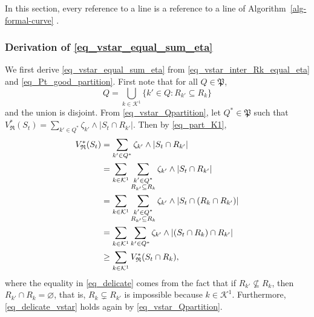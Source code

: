 \documentclass[
  11pt,
  a4paper,
]{article}
\theoremstyle{plain}
\theoremstyle{definition}
\theoremstyle{plain}
\theoremstyle{definition}
\theoremstyle{plain}
\theoremstyle{remark}
\begin{document}
In this section, every reference to a line is a reference to a line of
 Algorithm~\ref{alg-formal-curve} .

\subsubsection{\texorpdfstring{Derivation of
\eqref{eq_vstar_equal_sum_eta}}{Derivation of }}\label{derivation-of}

We first derive \eqref{eq_vstar_equal_sum_eta} from
\eqref{eq_vstar_inter_Rk_equal_eta} and \eqref{eq_Pt_good_partition}.
First note that for all \(Q\in\mathfrak P\), \begin{equation}
Q=\bigcup_{k\in\mathcal{K}^1}\{ k' \in Q : R_{k'}\subseteq R_k\}
\label{eq_part_K1}
\end{equation} and the union is disjoint. From
\eqref{eq_vstar_Qpartition}, let \(Q^*\in\mathfrak P\) such that
\(V^*_{\mathfrak{R}}(S_t) = \sum_{k'\in Q^*} \zeta_{k'}\wedge |S_t\cap R_{k'}|\).
Then by \eqref{eq_part_K1}, \begin{align}
V^*_{\mathfrak{R}}(S_t) &= \sum_{k'\in Q^*} \zeta_{k'}\wedge |S_t\cap R_{k'}|\notag\\
&=\sum_{k\in\mathcal{K}^1}  \sum_{\substack{k'\in Q^*\\ R_{k'}\subseteq R_k}} \zeta_{k'}\wedge |S_t\cap R_{k'}|\notag \\
&=\sum_{k\in\mathcal{K}^1}  \sum_{\substack{k'\in Q^*\\ R_{k'}\subseteq R_k}} \zeta_{k'}\wedge |S_t\cap (R_{k}\cap R_{k'})| \notag\\
&=\sum_{k\in\mathcal{K}^1}  \sum_{k'\in Q^*} \zeta_{k'}\wedge |(S_t\cap R_{k})\cap R_{k'}| \label{eq_delicate} \\
&\geq \sum_{k\in\mathcal{K}^1} V^*_{\mathfrak{R}}(S_t\cap R_k),\label{eq_delicate_vstar}
\end{align} where the equality in \eqref{eq_delicate} comes from the
fact that if \(R_{k'}\not\subseteq R_k\), then
\(R_{k'}\cap R_k=\varnothing\), that is, \(R_{k}\subsetneq R_{k'}\) is
impossible because \(k\in\mathcal K^1\). Furthermore,
\eqref{eq_delicate_vstar} holds again by \eqref{eq_vstar_Qpartition}.
\end{document}
